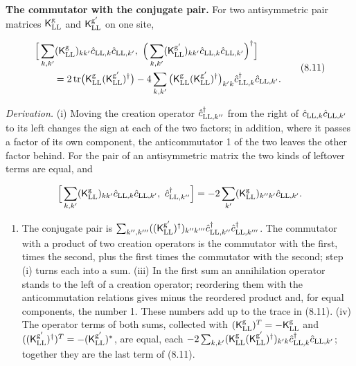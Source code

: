 \documentclass[
  10pt,
]{article}
\providecommand{\tightlist}{%
  \setlength{\itemsep}{0pt}\setlength{\parskip}{0pt}}
\begin{document}
\textbf{The commutator with the conjugate pair.} For two antisymmetric
pair matrices \(\mathsf K^{\rm g}_{\rm LL}\) and
\(\mathsf K^{\rm g'}_{\rm LL}\) on one site,

\[\begin{aligned}&\Big[\sum_{k,k'}(\mathsf K^{\rm g}_{\rm LL})_{kk'}\hat c_{{\rm LL},k}\hat c_{{\rm LL},k'},\ \Big(\sum_{k,k'}(\mathsf K^{\rm g'}_{\rm LL})_{kk'}\hat c_{{\rm LL},k}\hat c_{{\rm LL},k'}\Big)^\dagger\Big]\\&\qquad=2\,\mathrm{tr}\big(\mathsf K^{\rm g}_{\rm LL}(\mathsf K^{\rm g'}_{\rm LL})^\dagger\big)-4\sum_{k,k'}\big(\mathsf K^{\rm g}_{\rm LL}(\mathsf K^{\rm g'}_{\rm LL})^\dagger\big)_{k'k}\hat c^\dagger_{{\rm LL},k}\hat c_{{\rm LL},k'}.\end{aligned}\tag{8.11}\]

\emph{Derivation.} (i) Moving the creation operator
\(\hat c^\dagger_{{\rm LL},k''}\) from the right of
\(\hat c_{{\rm LL},k}\hat c_{{\rm LL},k'}\) to its left changes the sign
at each of the two factors; in addition, where it passes a factor of its
own component, the anticommutator 1 of the two leaves the other factor
behind. For the pair of an antisymmetric matrix the two kinds of
leftover terms are equal, and

\[\Big[\sum_{k,k'}(\mathsf K^{\rm g}_{\rm LL})_{kk'}\hat c_{{\rm LL},k}\hat c_{{\rm LL},k'},\ \hat c^\dagger_{{\rm LL},k''}\Big]=-2\sum_{k'}(\mathsf K^{\rm g}_{\rm LL})_{k''k'}\hat c_{{\rm LL},k'}.\]

\begin{enumerate}
\def\labelenumi{(\roman{enumi})}
\setcounter{enumi}{1}
\tightlist
\item
  The conjugate pair is
  \(\sum_{k'',k'''}((\mathsf K^{\rm g'}_{\rm LL})^\dagger)_{k''k'''}\hat c^\dagger_{{\rm LL},k''}\hat c^\dagger_{{\rm LL},k'''}\).
  The commutator with a product of two creation operators is the
  commutator with the first, times the second, plus the first times the
  commutator with the second; step (i) turns each into a sum. (iii) In
  the first sum an annihilation operator stands to the left of a
  creation operator; reordering them with the anticommutation relations
  gives minus the reordered product and, for equal components, the
  number 1. These numbers add up to the trace in (8.11). (iv) The
  operator terms of both sums, collected with
  \((\mathsf K^{\rm g}_{\rm LL})^T=-\mathsf K^{\rm g}_{\rm LL}\) and
  \(((\mathsf K^{\rm g'}_{\rm LL})^\dagger)^T=-(\mathsf K^{\rm g'}_{\rm LL})^*\),
  are equal, each
  \(-2\sum_{k,k'}(\mathsf K^{\rm g}_{\rm LL}(\mathsf K^{\rm g'}_{\rm LL})^\dagger)_{k'k}\hat c^\dagger_{{\rm LL},k}\hat c_{{\rm LL},k'}\);
  together they are the last term of (8.11).
\end{enumerate}
\end{document}
